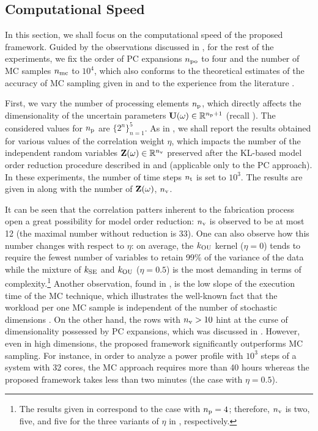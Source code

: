 \subsection{Computational Speed}

In this section, we shall focus on the computational speed of the proposed framework.
Guided by the observations discussed in , for the rest of the experiments, we fix the order of PC expansions ${n_\text{po}}$ to four and the number of MC samples ${n_\text{mc}}$ to $10^4$, which also conforms to the theoretical estimates of the accuracy of MC sampling given in \cite{diaz-emparanza2002} and to the experience from the literature \cite{xiu2010, maitre2010, shen2009, eldred2008}.

First, we vary the number of processing elements ${n_\text{p}}$, which directly affects the dimensionality of the uncertain parameters $\mathbf{U}(\omega) \in \mathbb{R}^{{n_\text{p}} + 1}$ (recall ).
The considered values for ${n_\text{p}}$ are $\{ 2^n \}_{n = 1}^5$.
As in , we shall report the results obtained for various values of the correlation weight $\eta$, which impacts the number of the independent random variables $\mathbf{Z}(\omega) \in \mathbb{R}^{n_\text{v}}$ preserved after the KL-based model order reduction procedure described in  and  (applicable only to the PC approach).
In these experiments, the number of time steps ${n_\text{t}}$ is set to $10^3$.
The results are given in  along with the number of $\mathbf{Z}(\omega)$, ${n_\text{v}}$.

It can be seen that the correlation patters inherent to the fabrication process \cite{cheng2011} open a great possibility for model order reduction: ${n_\text{v}}$ is observed to be at most 12 (the maximal number without reduction is 33).
One can also observe how this number changes with respect to $\eta$: on average, the $\fCorr_\OU$ kernel ($\eta = 0$) tends to require the fewest number of variables to retain 99\% of the variance of the data while the mixture of $\fCorr_\SE$ and $\fCorr_\OU$ ($\eta = 0.5$) is the most demanding in terms of complexity.\footnote{The results given in  correspond to the case with ${n_\text{p}} = 4$; therefore, ${n_\text{v}}$ is two, five, and five for the three variants of $\eta$ in , respectively.}
Another observation, found in , is the low slope of the execution time of the MC technique, which illustrates the well-known fact that the workload per one MC sample is independent of the number of stochastic dimensions \cite{maitre2010}.
On the other hand, the rows with ${n_\text{v}} > 10$ hint at the curse of dimensionality possessed by PC expansions, which was discussed in .
However, even in high dimensions, the proposed framework significantly outperforms MC sampling. For instance, in order to analyze a power profile with $10^3$ steps of a system with 32 cores, the MC approach requires more than 40 hours whereas the proposed framework takes less than two minutes (the case with $\eta = 0.5$).

